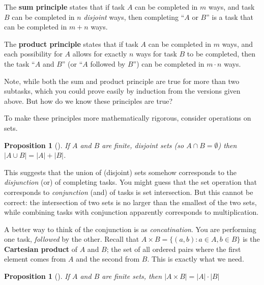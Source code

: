 \documentclass[10pt,]{book}
\newcommand{\terminology}[1]{\textbf{#1}}
\theoremstyle{plain}
\newtheorem{proposition}[theorem]{Proposition}
\theoremstyle{definition}
\theoremstyle{definition}
\theoremstyle{definition}
\theoremstyle{definition}
\numberwithin{equation}{chapter}
\def\st{:}
\newcommand{\card}[1]{\left| #1 \right|}
\begin{document}
\begin{assemblage}\label{assemblage-8}
\hypertarget{p-504}{}%
The \terminology{sum principle} states that if task \(A\) can be completed in \(m\) ways, and task \(B\) can be completed in \(n\) \emph{disjoint} ways, then completing ``\(A\) or \(B\)'' is a task that can be completed in \(m + n\) ways.%
\end{assemblage}
\begin{assemblage}\label{assemblage-9}
\hypertarget{p-505}{}%
The \terminology{product principle} states that if task \(A\) can be completed in \(m\) ways, and each possibility for \(A\) allows for exactly \(n\) ways for task \(B\) to be completed, then the task ``\(A\) and \(B\)'' (or ``\(A\) followed by \(B\)'') can be completed in \(m \cdot n\) ways.%
\end{assemblage}
\hypertarget{p-506}{}%
Note, while both the sum and product principle are true for more than two subtasks, which you could prove easily by induction from the versions given above.  But how do we know these principles are true?%
\par
\hypertarget{p-507}{}%
To make these principles more mathematically rigorous, consider operations on sets.%
\begin{proposition}[{}]\label{prop-unioncard}
\hypertarget{p-508}{}%
If \(A\) and \(B\) are finite, disjoint sets (so \(A \cap B = \emptyset\)) then \(\card{A \cup B} = \card{A} + \card{B}\).%
\end{proposition}
\hypertarget{p-509}{}%
This suggests that the union of (disjoint) sets somehow corresponds to the \emph{disjunction} (or) of completing tasks.  You might guess that the set operation that corresponds to \emph{conjunction} (and) of tasks is set intersection.  But this cannot be correct: the intersection of two sets is no larger than the smallest of the two sets, while combining tasks with conjunction apparently corresponds to multiplication.%
\par
\hypertarget{p-510}{}%
A better way to think of the conjunction is as \emph{concatination}.  You are performing one task, \emph{followed} by the other.  Recall that \(A \times B = \{(a,b) \st a \in A, b \in B\}\) is the \terminology{Cartesian product} of \(A\) and \(B\); the set of all ordered pairs where the first element comes from \(A\) and the second from \(B\).  This is exactly what we need.%
\begin{proposition}[{}]\label{prop-prodcard}
\hypertarget{p-511}{}%
If \(A\) and \(B\) are finite sets, then \(\card{A \times B} = \card{A} \cdot \card{B}\)%
\end{proposition}
\end{document}
